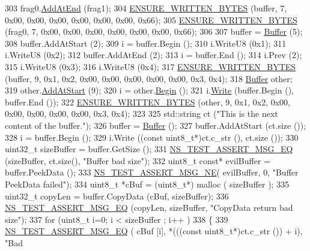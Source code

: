 \begin{DoxyCode}
303   frag0.\hyperlink{classns3_1_1Buffer_a92dd87809af24fb10696fee9a9cb56cf}{AddAtEnd} (frag1);
304   \hyperlink{buffer-test_8cc_adb8db1b0f6eec9da1f9f6d8b9f1e4ba8}{ENSURE\_WRITTEN\_BYTES} (buffer, 7, 0x00, 0x00, 0x00, 0x00, 0x00, 0x00, 0x66);
305   \hyperlink{buffer-test_8cc_adb8db1b0f6eec9da1f9f6d8b9f1e4ba8}{ENSURE\_WRITTEN\_BYTES} (frag0, 7, 0x00, 0x00, 0x00, 0x00, 0x00, 0x00, 0x66);
306 
307   buffer = \hyperlink{classns3_1_1Buffer}{Buffer} (5);
308   buffer.AddAtStart (2);
309   i = buffer.Begin ();
310   i.WriteU8 (0x1);
311   i.WriteU8 (0x2);
312   buffer.AddAtEnd (2);
313   i = buffer.End ();
314   i.Prev (2);
315   i.WriteU8 (0x3);
316   i.WriteU8 (0x4);
317   \hyperlink{buffer-test_8cc_adb8db1b0f6eec9da1f9f6d8b9f1e4ba8}{ENSURE\_WRITTEN\_BYTES} (buffer, 9, 0x1, 0x2, 0x00, 0x00, 0x00, 0x00, 0x00, 0x3, 0x4);
318   \hyperlink{classns3_1_1Buffer}{Buffer} other;
319   other.\hyperlink{classns3_1_1Buffer_a8abd8164c3671d3dadc98fc66fade7b1}{AddAtStart} (9);
320   i = other.\hyperlink{classns3_1_1Buffer_a893d4bf50df13e730b6cd0fda91b967f}{Begin} ();
321   i.\hyperlink{classns3_1_1Buffer_1_1Iterator_a087b4e6b5d038544c750c741e8932d69}{Write} (buffer.Begin (), buffer.End ());
322   \hyperlink{buffer-test_8cc_adb8db1b0f6eec9da1f9f6d8b9f1e4ba8}{ENSURE\_WRITTEN\_BYTES} (other, 9, 0x1, 0x2, 0x00, 0x00, 0x00, 0x00, 0x00, 0x3, 0x4);
323 
325   std::string ct (\textcolor{stringliteral}{"This is the next content of the buffer."});
326   buffer = \hyperlink{classns3_1_1Buffer}{Buffer} ();
327   buffer.AddAtStart (ct.size ());
328   i = buffer.Begin ();
329   i.Write ((\textcolor{keyword}{const} uint8\_t*)ct.c\_str (), ct.size ());
330   uint32\_t sizeBuffer = buffer.GetSize ();
331   \hyperlink{group__testing_ga2a9d78cffb3db8e867c35fff0b698cf5}{NS\_TEST\_ASSERT\_MSG\_EQ} (sizeBuffer, ct.size(), \textcolor{stringliteral}{"Buffer bad size"});
332   uint8\_t \textcolor{keyword}{const}* evilBuffer = buffer.PeekData ();
333   \hyperlink{group__testing_ga73d66fb0050a5111453fd144e767b91a}{NS\_TEST\_ASSERT\_MSG\_NE}( evilBuffer, 0, \textcolor{stringliteral}{"Buffer PeekData failed"});
334   uint8\_t *cBuf = (uint8\_t*) malloc ( sizeBuffer );
335   uint32\_t copyLen = buffer.CopyData (cBuf, sizeBuffer);
336   \hyperlink{group__testing_ga2a9d78cffb3db8e867c35fff0b698cf5}{NS\_TEST\_ASSERT\_MSG\_EQ} (copyLen, sizeBuffer, \textcolor{stringliteral}{"CopyData return bad size"});
337   \textcolor{keywordflow}{for} (uint8\_t i=0; i < sizeBuffer ; i++ )
338     \{
339       \hyperlink{group__testing_ga2a9d78cffb3db8e867c35fff0b698cf5}{NS\_TEST\_ASSERT\_MSG\_EQ} ( cBuf [i], *(((\textcolor{keyword}{const} uint8\_t*)ct.c\_str ()) + i), \textcolor{stringliteral}{"Bad
}
\end{DoxyCode}
